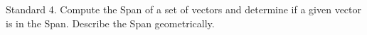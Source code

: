 Standard 4.	Compute the Span of a set of vectors and determine if a given vector is in the Span. Describe the Span geometrically.

\ifprintanswers
\else %
 \newpage
\fi

\begin{solution}
   
\end{solution}
